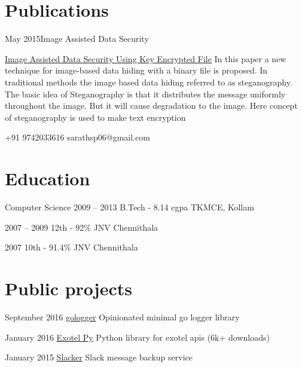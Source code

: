 \documentclass{tccv}
\begin{document}
\section{Publications}

\begin{eventlist}
\item{May 2015}{}{Image Assisted Data Security}
     
\href{http://www.ijert.org/view-pdf/13070/image-assisted-data-security-using-key-encrypted-file}{Image Assisted Data Security Using Key Encrypted File} 
In this paper a new technique for image-based data hiding with a binary file is proposed. In traditional methods the image based data hiding referred to as steganography. The basic idea of Steganography is that it distributes the message uniformly throughout the image. But it will cause degradation to the image. Here concept of steganography is used to make text encryption

\end{eventlist}


    {+91 9742033616}
    {sarathsp06@gmail.com}

\section{Education}

\begin{yearlist}

\item[Computer Science]{2009 -- 2013}
     {B.Tech - 8.14 cgpa }
     {TKMCE, Kollam }

\item{2007 -- 2009}
     {12th - 92\% }
     {JNV Chennithala}

\item{2007 }
     {10th - 91.4\% }
     {JNV Chennithala}


\end{yearlist}

 \section{Public projects}

 \begin{yearlist}

 \item{September 2016}
      {\href{https://github.com/sarathsp06/gologger}{gologger}}
      {Opinionated minimal go logger library}

\item{January 2016}
      {\href{https://github.com/sarathsp06/exotel-py#exotel-py-}{Exotel Py}}
      {Python library for exotel apis (6k+ downloads)}


\item{January 2015}
      {\href{https://github.com/sarathsp06/slacker}{Slacker}}
      {Slack message backup service}

\end{yearlist}
\end{document}
